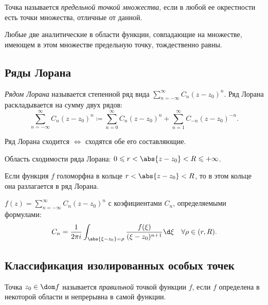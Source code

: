 \begin{definition}
	Точка называется \emph{предельной точкой множества}, если в любой ее окрестности есть точки множества, отличные от данной.
\end{definition}

\begin{corollary}
	Любые две аналитические в области функции, совпадающие на множестве, имеющем в этом множестве предельную точку, тождественно равны.
\end{corollary}

\subsection{Ряды Лорана}

\begin{definition}
	\emph{Рядом Лорана} называется степенной ряд вида $\sum_{n=-\infty }^{\infty } C_n(z-z_0)^n$. Ряд Лорана раскладывается на сумму двух рядов:
	\[
		\sum_{n=-\infty }^{\infty } C_n (z-z_0)^n \coloneq \sum_{n=0}^{\infty } C_n (z-z_0)^n + \sum_{n=1}^{\infty } C_{-n} (z-z_0)^{-n} .
	\]

	Ряд Лорана сходится $\iff $ сходятся обе его составляющие.

	Область сходимости ряда Лорана: $0 \leqslant r < \abs{z-z_0} < R \leqslant +\infty $.
\end{definition}

\begin{theorem}
	Если функция $f$ голоморфна в кольце $r < \abs{z-z_0} < R$, то в этом кольце она разлагается в ряд Лорана.

	$f(z) = \sum_{n=-\infty }^{\infty } C_n(z-z_0)^n$ с коэфициентами $C_n$, определяемыми формулами:
	\[
		C_n = \frac{1}{2\pi i} \int_{\abs{\xi -z_0} = \rho} \frac{f(\xi )}{(\xi -z_0)^{n+1} } \d \xi \quad \forall \rho \in (r,R).
	\]
\end{theorem}

\subsection{Классификация изолированных особых точек}

\begin{definition}
	Точка $z_0 \in \dom f$ называется \emph{правильной} точкой функции $f$, если $f$ определена в некоторой области и непрерывна в самой функции.
\end{definition}

